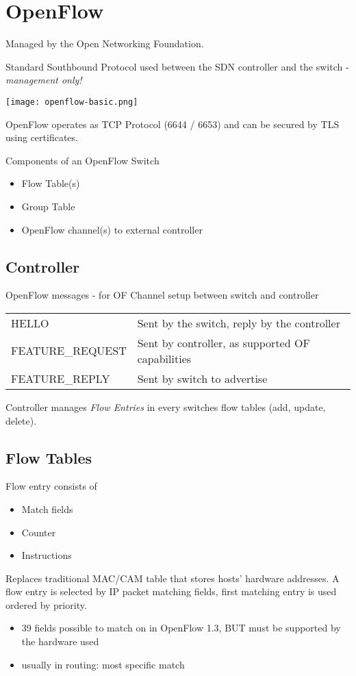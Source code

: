 \section{OpenFlow}
Managed by the Open Networking Foundation.

Standard Southbound Protocol used between the SDN controller and the switch - \emph{management only!}

\begin{centering}
\texttt{[image: openflow-basic.png]}
\end{centering}

OpenFlow operates as TCP Protocol (6644 / 6653) and can be secured by TLS using certificates.

\noindent
Components of an OpenFlow Switch
\begin{itemize}
	\item Flow Table(s)
	\item Group Table
	\item OpenFlow channel(s) to external controller
\end{itemize}

\subsection{Controller}
OpenFlow messages - for OF Channel setup between switch and controller
\begin{table}[]
	\begin{tabular}{l|l}
	HELLO & Sent by the switch, reply by the controller \\
		FEATURE\_REQUEST & Sent by controller, as supported OF capabilities \\
		FEATURE\_REPLY & Sent by switch to advertise \\
	\end{tabular}
\end{table}
Controller manages \emph{Flow Entries} in every switches flow tables (add, update, delete).

\subsection{Flow Tables}
Flow entry consists of
\begin{itemize}
	\item Match fields
	\item Counter
	\item Instructions
\end{itemize}

Replaces traditional MAC/CAM table that stores hosts' hardware addresses. A flow entry is selected by IP packet matching fields, first matching entry is used ordered by priority.
\begin{itemize}
	\item 39 fields possible to match on in OpenFlow 1.3, BUT must be supported by the hardware used
	\item usually in routing: most specific match
\end{itemize}

